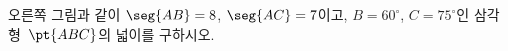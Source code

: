\noindent\begin{minipage}[t]{0.58\linewidth}\vspace{0pt}\raggedright 오른쪽 그림과 같이 $\seg{AB}=8$, $\seg{AC}=7$이고, $B=60^\circ$, $C=75^\circ$인 삼각형~$\pt{ABC}$의 넓이를 구하시오.\end{minipage}\hfill\begin{minipage}[t]{0.4\linewidth}\vspace{0pt}\centering \resizebox{\ifdim\width>\linewidth\linewidth\else\width\fi}{!}{}\end{minipage}\par

